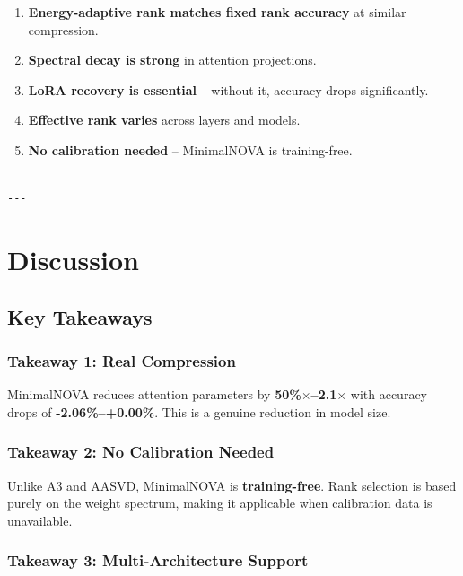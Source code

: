 \begin{enumerate}
\item \textbf{Energy-adaptive rank matches fixed rank accuracy} at similar compression.
\item \textbf{Spectral decay is strong} in attention projections.
\item \textbf{LoRA recovery is essential} -- without it, accuracy drops significantly.
\item \textbf{Effective rank varies} across layers and models.
\item \textbf{No calibration needed} -- MinimalNOVA is training-free.
\end{enumerate}
\begin{lstlisting}

---
\end{lstlisting}


\section{Discussion}

\subsection{Key Takeaways}

\subsubsection{Takeaway 1: Real Compression}

MinimalNOVA reduces attention parameters by \textbf{50\%$\times$--2.1$\times$} 
with accuracy drops of \textbf{-2.06\%--+0.00\%}. This is a genuine 
reduction in model size.

\subsubsection{Takeaway 2: No Calibration Needed}

Unlike A3 and AASVD, MinimalNOVA is \textbf{training-free}. Rank selection is 
based purely on the weight spectrum, making it applicable when calibration 
data is unavailable.

\subsubsection{Takeaway 3: Multi-Architecture Support}

